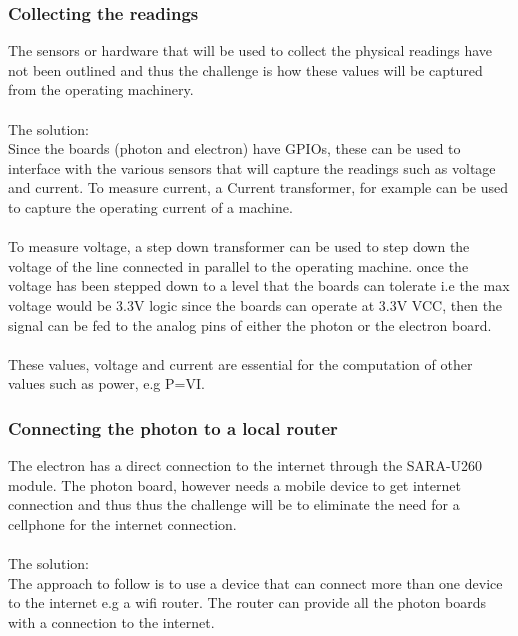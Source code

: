 \documentclass[a4paper,12pt]{article}
\begin{document}
\subsubsection{Collecting the readings}
The sensors or hardware that will be used to collect the physical readings have not been outlined and thus the challenge is how these values will be captured from the operating machinery.\\ \\
The solution:\\ 
Since the boards (photon and electron) have GPIOs, these can be used to interface with the various sensors that will capture the readings such as voltage and current. To measure current, a Current transformer, for example can be used to capture the operating current of a machine.\\
\\
To measure voltage, a step down transformer can be used to step down the voltage of the line connected in parallel to the operating machine. once the voltage has been stepped down to a level that the boards can tolerate i.e the max voltage would be 3.3V logic since the boards can operate at 3.3V VCC, then the signal can be fed to the analog pins of either the photon or the electron board.
\\ \\
These values, voltage and current are essential for the computation of other values such as power, e.g P=VI. 

\subsubsection{Connecting the photon to a local router}
The electron has a direct connection to the internet through the SARA-U260 module. The photon board, however needs a mobile device to get internet connection and thus thus the challenge will be to eliminate the need for a cellphone for the internet connection.\\ \\
The solution:\\
The approach to follow is to use a device that can connect more than one device to the internet e.g a wifi router. The router can provide all the photon boards with a connection to the internet. 
\end{document}
